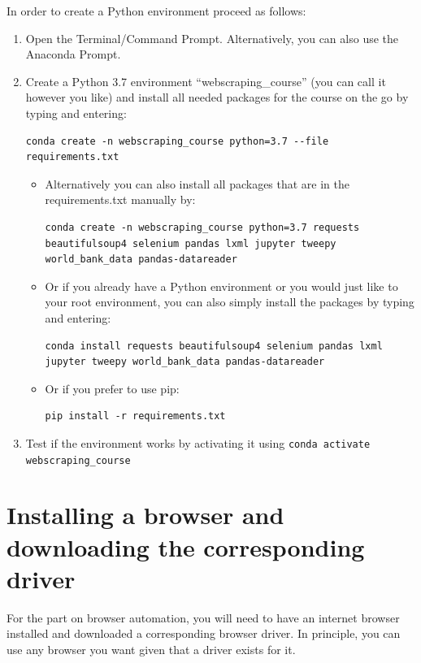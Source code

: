 \documentclass[a4paper]{article}
\begin{document}
In order to create a Python environment proceed as follows:
\begin{enumerate}
	\item Open the Terminal/Command Prompt. Alternatively, you can also use the Anaconda Prompt.
	\item Create a Python 3.7 environment ``webscraping\_course'' (you can call it however you like) and install all needed packages for the course on the go by typing and entering:
\begin{verbatim}
conda create -n webscraping_course python=3.7 --file requirements.txt
\end{verbatim}
	\begin{itemize}
            \item Alternatively you can also install all packages that are in the requirements.txt manually by:
\begin{verbatim}
conda create -n webscraping_course python=3.7 requests beautifulsoup4 selenium pandas lxml jupyter tweepy world_bank_data pandas-datareader
\end{verbatim}
            \item Or if you already have a Python environment or you would just like to your root environment, you can also simply install the packages by typing and entering:
\begin{verbatim}
conda install requests beautifulsoup4 selenium pandas lxml jupyter tweepy world_bank_data pandas-datareader
\end{verbatim}
            \item Or if you prefer to use pip:
\begin{verbatim}
pip install -r requirements.txt
\end{verbatim}
	\end{itemize}
	\item Test if the environment works by activating it using \texttt{conda activate webscraping_course}
\end{enumerate}

\section{Installing a browser and downloading the corresponding driver}

For the part on browser automation, you will need to have an internet browser installed and downloaded a corresponding browser driver. In principle, you can use any browser you want given that a driver exists for it.
\end{document}
